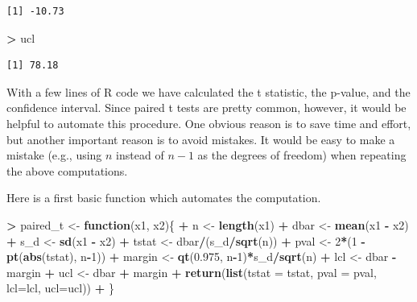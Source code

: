 \documentclass[]{krantz}
\makeatletter
\newenvironment{Shaded}{\begin{snugshade}}{\end{snugshade}}
\newcommand{\KeywordTok}[1]{\textcolor[rgb]{0.27,0.27,0.27}{\textbf{#1}}}
\newcommand{\DataTypeTok}[1]{\textcolor[rgb]{0.27,0.27,0.27}{#1}}
\newcommand{\DecValTok}[1]{\textcolor[rgb]{0.06,0.06,0.06}{#1}}
\newcommand{\FloatTok}[1]{\textcolor[rgb]{0.06,0.06,0.06}{#1}}
\newcommand{\StringTok}[1]{\textcolor[rgb]{0.5,0.5,0.5}{#1}}
\newcommand{\ControlFlowTok}[1]{\textcolor[rgb]{0.27,0.27,0.27}{\textbf{#1}}}
\newcommand{\OperatorTok}[1]{\textcolor[rgb]{0.43,0.43,0.43}{\textbf{#1}}}
\newcommand{\NormalTok}[1]{#1}
\newenvironment{kframe}{%
\medskip{}
\setlength{\fboxsep}{.8em}
 \def\at@end@of@kframe{}%
 \ifinner\ifhmode%
  \def\at@end@of@kframe{\end{minipage}}%
  \begin{minipage}{\columnwidth}%
 \fi\fi%
 \def\FrameCommand##1{\hskip\@totalleftmargin \hskip-\fboxsep
 \colorbox{shadecolor}{##1}\hskip-\fboxsep
     \hskip-\linewidth \hskip-\@totalleftmargin \hskip\columnwidth}%
 \MakeFramed {\advance\hsize-\width
   \@totalleftmargin\z@ \linewidth\hsize
   \@setminipage}}%
 {\par\unskip\endMakeFramed%
 \at@end@of@kframe}
\renewenvironment{Shaded}{\begin{kframe}}{\end{kframe}}
\makeatother
\begin{document}
\begin{verbatim}
[1] -10.73
\end{verbatim}

\begin{Shaded}
\begin{Highlighting}[]
\OperatorTok{>}\StringTok{ }\NormalTok{ucl}
\end{Highlighting}
\end{Shaded}

\begin{verbatim}
[1] 78.18
\end{verbatim}

With a few lines of R code we have calculated the t statistic, the
p-value, and the confidence interval. Since paired t tests are pretty
common, however, it would be helpful to automate this procedure. One
obvious reason is to save time and effort, but another important reason
is to avoid mistakes. It would be easy to make a mistake (e.g., using
\(n\) instead of \(n-1\) as the degrees of freedom) when repeating the
above computations.

Here is a first basic function which automates the computation.

\begin{Shaded}
\begin{Highlighting}[]
\OperatorTok{>}\StringTok{ }\NormalTok{paired_t <-}\StringTok{ }\ControlFlowTok{function}\NormalTok{(x1, x2)\{}
\OperatorTok{+}\StringTok{     }\NormalTok{n <-}\StringTok{ }\KeywordTok{length}\NormalTok{(x1)}
\OperatorTok{+}\StringTok{     }\NormalTok{dbar <-}\StringTok{ }\KeywordTok{mean}\NormalTok{(x1 }\OperatorTok{-}\StringTok{ }\NormalTok{x2)}
\OperatorTok{+}\StringTok{     }\NormalTok{s_d <-}\StringTok{ }\KeywordTok{sd}\NormalTok{(x1 }\OperatorTok{-}\StringTok{ }\NormalTok{x2)}
\OperatorTok{+}\StringTok{     }\NormalTok{tstat <-}\StringTok{ }\NormalTok{dbar}\OperatorTok{/}\NormalTok{(s_d}\OperatorTok{/}\KeywordTok{sqrt}\NormalTok{(n))}
\OperatorTok{+}\StringTok{     }\NormalTok{pval <-}\StringTok{ }\DecValTok{2}\OperatorTok{*}\NormalTok{(}\DecValTok{1} \OperatorTok{-}\StringTok{ }\KeywordTok{pt}\NormalTok{(}\KeywordTok{abs}\NormalTok{(tstat), n}\OperatorTok{-}\DecValTok{1}\NormalTok{))}
\OperatorTok{+}\StringTok{     }\NormalTok{margin <-}\StringTok{ }\KeywordTok{qt}\NormalTok{(}\FloatTok{0.975}\NormalTok{, n}\OperatorTok{-}\DecValTok{1}\NormalTok{)}\OperatorTok{*}\NormalTok{s_d}\OperatorTok{/}\KeywordTok{sqrt}\NormalTok{(n)}
\OperatorTok{+}\StringTok{     }\NormalTok{lcl <-}\StringTok{ }\NormalTok{dbar }\OperatorTok{-}\StringTok{ }\NormalTok{margin}
\OperatorTok{+}\StringTok{     }\NormalTok{ucl <-}\StringTok{ }\NormalTok{dbar }\OperatorTok{+}\StringTok{ }\NormalTok{margin}
\OperatorTok{+}\StringTok{     }\KeywordTok{return}\NormalTok{(}\KeywordTok{list}\NormalTok{(}\DataTypeTok{tstat =}\NormalTok{ tstat, }\DataTypeTok{pval =}\NormalTok{ pval, }\DataTypeTok{lcl=}\NormalTok{lcl, }\DataTypeTok{ucl=}\NormalTok{ucl))}
\OperatorTok{+}\StringTok{ }\NormalTok{\}}
\end{Highlighting}
\end{Shaded}
\end{document}
